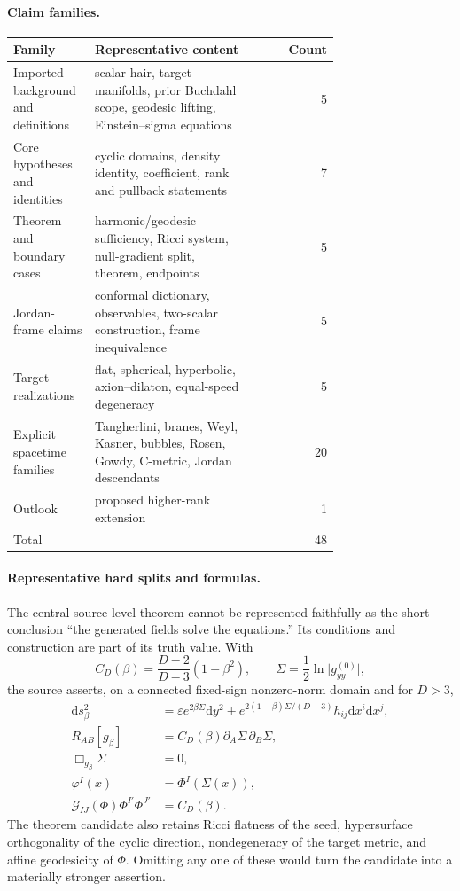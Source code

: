 \paragraph{Claim families.}
\begin{center}
\begin{tabular}{p{0.25\linewidth}p{0.48\linewidth}r}
\hline
Family & Representative content & Count \\
\hline
Imported background and definitions & scalar hair, target manifolds, prior Buchdahl scope, geodesic lifting, Einstein--sigma equations & 5 \\
Core hypotheses and identities & cyclic domains, density identity, coefficient, rank and pullback statements & 7 \\
Theorem and boundary cases & harmonic/geodesic sufficiency, Ricci system, null-gradient split, theorem, endpoints & 5 \\
Jordan-frame claims & conformal dictionary, observables, two-scalar construction, frame inequivalence & 5 \\
Target realizations & flat, spherical, hyperbolic, axion--dilaton, equal-speed degeneracy & 5 \\
Explicit spacetime families & Tangherlini, branes, Weyl, Kasner, bubbles, Rosen, Gowdy, C-metric, Jordan descendants & 20 \\
Outlook & proposed higher-rank extension & 1 \\
\hline
Total & & 48 \\
\hline
\end{tabular}
\end{center}

\paragraph{Representative hard splits and formulas.}
The central source-level theorem cannot be represented faithfully as the short conclusion ``the generated fields solve the equations.'' Its conditions and construction are part of its truth value. With
\[
C_D(\beta)=\frac{D-2}{D-3}(1-\beta^2),
\qquad
\Sigma=\frac12\ln\lvert g^{(0)}_{yy}\rvert,
\]
the source asserts, on a connected fixed-sign nonzero-norm domain and for $D>3$,
\begin{align}
\mathrm d s_\beta^2
&=\varepsilon e^{2\beta\Sigma}\mathrm d y^2
 +e^{2(1-\beta)\Sigma/(D-3)}h_{ij}\mathrm d x^i\mathrm d x^j,\\
R_{AB}[g_\beta]
&=C_D(\beta) \partial_A\Sigma\,\partial_B\Sigma,\\
\Box_{g_\beta}\Sigma&=0,\\
\varphi^I(x)&=\Phi^I(\Sigma(x)),\\
\mathcal G_{IJ}(\Phi)\Phi^{I\prime}\Phi^{J\prime}
&=C_D(\beta).
\end{align}
The theorem candidate also retains Ricci flatness of the seed, hypersurface orthogonality of the cyclic direction, nondegeneracy of the target metric, and affine geodesicity of $\Phi$. Omitting any one of these would turn the candidate into a materially stronger assertion.

